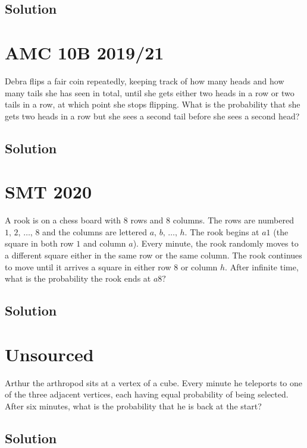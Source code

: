 \documentclass{article}
\begin{document}
\subsection{Solution}

\pagebreak\section{AMC 10B 2019/21} Debra flips a fair coin repeatedly, keeping track of how many heads and how many tails she has seen in total, until she gets either two heads in a row or two tails in a row, at which point she stops flipping. What is the probability that she gets two heads in a row but she sees a second tail before she sees a second head?
\subsection{Solution}




\pagebreak\section{SMT 2020} A rook is on a chess board with $8$ rows and $8$ columns. The rows are numbered $1,\, 2,\, \ldots,\, 8$ and the columns are lettered $a,\, b,\, \ldots,\, h.$ The rook begins at $a1$ (the square in both row $1$ and column $a$). Every minute, the rook randomly moves to a different square either in the same row or the same column. The rook continues to move until it arrives a square in either row $8$ or column $h.$ After infinite time, what is the probability the rook ends at $a8?$
\subsection{Solution}




\pagebreak\section{Unsourced}{Arthur the arthropod sits at a vertex of a cube.  Every minute he teleports to one of the three adjacent vertices, each having equal probability of being selected.  After six minutes, what is the probability that he is back at the start?}
\subsection{Solution}
\end{document}
